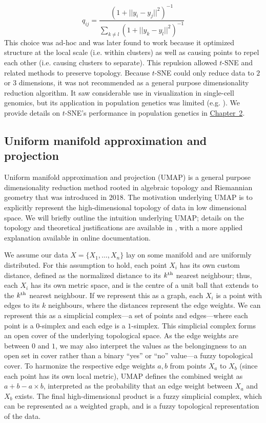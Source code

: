 $$q_{ij} = \frac{(1 + ||y_{i} - y_{j}||^{2})^{-1}}{\sum_{k \neq l}(1 + ||y_{k} - y_{l}||^{2})^{-1}}$$ This choice was ad-hoc and was later found to work because it optimized structure at the local scale (i.e. within clusters) as well as causing points to repel each other (i.e. causing clusters to separate)\citep{carreira-perpinan_elastic_2010}. This repulsion allowed $t$-SNE and related methods to preserve topology\citep{wasserman_topological_2018}. Because $t$-SNE could only reduce data to $2$ or $3$ dimensions, it was not recommended as a general purpose dimensionality reduction algorithm\citep{maaten_visualizing_2008}. It saw considerable use in visualization in single-cell genomics\citep{kobak_art_2019}, but its application in population genetics was limited (e.g. \citep{li_application_2017}). We provide details on $t$-SNE's performance in population genetics in \hyperref[chap:chapter2]{Chapter~2}.

\subsection{Uniform manifold approximation and projection}

Uniform manifold approximation and projection (UMAP) is a general purpose dimensionality reduction method rooted in algebraic topology and Riemannian geometry that was introduced in 2018\citep{mcinnes_umap_2020}. The motivation underlying UMAP is to explicitly represent the high-dimensional topology of data in low dimensional space. We will briefly outline the intuition underlying UMAP; details on the topology and theoretical justifications are available in \citep{mcinnes_umap_2020}, with a more applied explanation available in online documentation\citep{mcinnes_umapdoc_2018}.

We assume our data $X = \{X_{1}, \dots, X_{n}\}$ lay on some manifold and are uniformly distributed. For this assumption to hold, each point $X_{i}$ has its own custom distance, defined as the normalized distance to its $k\textsuperscript{th}$ nearest neighbour; thus, each $X_{i}$ has its own metric space, and is the centre of a unit ball that extends to the $k\textsuperscript{th}$ nearest neighbour. If we represent this as a graph, each $X_i$ is a point with edges to its $k$ neighbours, where the distances represent the edge weights. We can represent this as a simplicial complex---a set of points and edges---where each point is a $0$-simplex and each edge is a $1$-simplex. This simplicial complex forms an open cover of the underlying topological space. As the edge weights are between $0$ and $1$, we may also interpret the values as the belongingness to an open set in cover rather than a binary ``yes'' or ``no'' value---a fuzzy topological cover. To harmonize the respective edge weights $a, b$ from points $X_{a}$ to $X_{b}$ (since each point has its own local metric), UMAP defines the combined weight as $a + b - a \times b$, interpreted as the probability that an edge weight between $X_{a}$ and $X_{b}$ exists. The final high-dimensional product is a fuzzy simplicial complex, which can be represented as a weighted graph, and is a fuzzy topological representation of the data.

